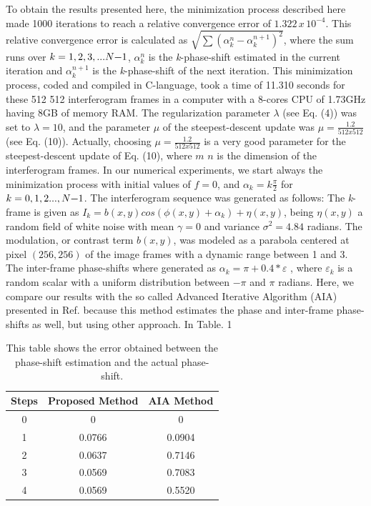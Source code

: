 To obtain the results presented here, the minimization process described
here made 1000 iterations to reach a relative convergence error of
$1.322\, x\,10^{-4}$. This relative convergence error is calculated
as $\sqrt{\sum(\alpha_{k}^{n}-\alpha_{k}^{n+1})^{2}}$, where the
sum runs over $k=1,2,3,...N\text{\textminus}1$, $\alpha_{k}^{n}$
is the \emph{k}-phase-shift estimated in the current iteration and
$\alpha_{k}^{n+1}$ is the \emph{k}-phase-shift of the next iteration.
This minimization process, coded and compiled in C-language, took
a time of 11.310 seconds for these 512 \texttimes{} 512 interferogram
frames in a computer with a 8-cores CPU of 1.73GHz having 8GB of memory
RAM. The regularization parameter $\lambda$ (see Eq. (4)) was set
to $\lambda=10$, and the parameter $\mu$ of the steepest-descent
update was $\mu=\frac{1.2}{512x512}$ (see Eq. (10)). Actually, choosing
$\mu=\frac{1.2}{512x512}$ is a very good parameter for the steepest-descent
update of Eq. (10), where $m$ \texttimes{} $n$ is the dimension
of the interferogram frames. In our numerical experiments, we start
always the minimization process with initial values of $f=0$, and
$\alpha_{k}=k\frac{\pi}{2}$ for $k=0,1,2...,N\text{\textminus}1$.
The interferogram sequence was generated as follows: The \emph{k}-frame
is given as $I_{k}=b(x,y)cos(\phi(x,y)+\alpha_{k})+\eta(x,y)$, being
$\eta(x,y)$ a random field of white noise with mean $\gamma=0$ and
variance $\sigma^{2}=4.84$ radians. The modulation, or contrast term
$b(x,y)$, was modeled as a parabola centered at pixel $(256,256)$
of the image frames with a dynamic range between 1 and 3. The inter-frame
phase-shifts where generated as $\alpha_{k}=\pi+0.4*\varepsilon$
, where $\varepsilon_{k}$ is a random scalar with a uniform distribution
between $-\pi$ and $\pi$ radians. Here, we compare our results with
the so called Advanced Iterative Algorithm (AIA) presented in Ref.
\cite{Wang:04} because this method estimates the phase and inter-frame
phase-shifts as well, but using other approach. In Table. 1
\begin{table}
\begin{centering}
\begin{tabular}{|c|c|c|}
\hline 
Steps & Proposed Method & AIA Method\tabularnewline
\hline 
\hline 
0 & 0 & 0\tabularnewline
\hline 
1 & 0.0766 & 0.0904\tabularnewline
\hline 
2 & 0.0637 & 0.7146\tabularnewline
\hline 
3 & 0.0569 & 0.7083\tabularnewline
\hline 
4 & 0.0569 & 0.5520\tabularnewline
\hline 
\end{tabular}
\par\end{centering}

\caption{This table shows the error obtained between the phase-shift estimation
and the actual phase-shift.}
\end{table}
